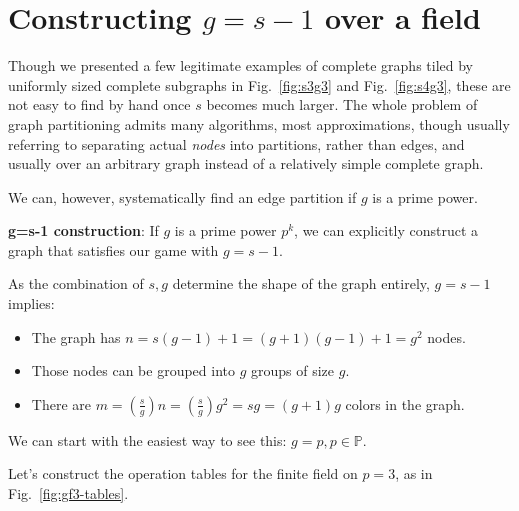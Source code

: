 \documentclass[11pt, oneside]{article} 	%
\begin{document}
\section{Constructing $g = s-1$ over a field}

Though we presented a few legitimate examples of complete graphs tiled by uniformly sized complete subgraphs in Fig.~\ref{fig:s3g3} and Fig.~\ref{fig:s4g3}, these are not easy to find by hand once $s$ becomes much larger. The whole problem of graph partitioning admits many algorithms, most approximations\cite{3}, though usually referring to separating actual \emph{nodes} into partitions, rather than edges, and usually over an arbitrary graph instead of a relatively simple complete graph.

We can, however, systematically find an edge partition if $g$ is a prime power.

\begin{framed}
\textbf{g=s-1 construction}: If $g$ is a prime power $p^k$, we can explicitly construct a graph that satisfies our game with $g = s-1$.
\end{framed}


As the combination of $s, g$ determine the shape of the graph entirely, $g = s-1$ implies:
\begin{itemize}
\item The graph has $n = s(g-1) + 1 = (g+1)(g-1) + 1 = g^2$ nodes.
\item Those nodes can be grouped into $g$ groups of size $g$.
\item There are $m = (\frac{s}{g}) n = (\frac{s}{g}) g ^2 = sg = (g+1)g$ colors in the graph.
\end{itemize}


We can start with the easiest way to see this: $g = p, p \in \mathbb{P}$.

Let's construct the operation tables for the finite field on $p=3$, as in Fig.~\ref{fig:gf3-tables}.
\end{document}
